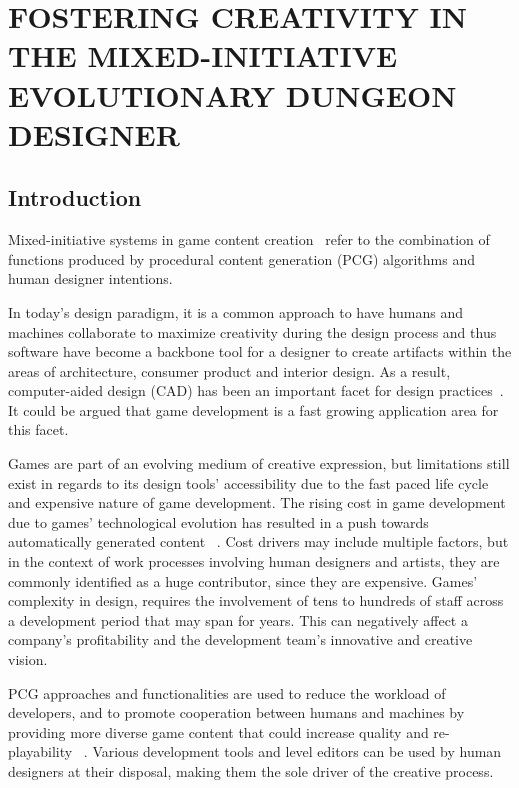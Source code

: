 \section*{FOSTERING CREATIVITY IN THE MIXED-INITIATIVE EVOLUTIONARY DUNGEON DESIGNER}

\subsection{Introduction} 

Mixed-initiative systems in game content creation~ refer to the combination of functions produced by procedural content generation (PCG) algorithms and human designer intentions. 

In today's design paradigm, it is a common approach to have humans and machines collaborate to maximize creativity during the design process and thus software have become a backbone tool for a designer to create artifacts within the areas of architecture, consumer product and interior design. As a result, computer-aided design (CAD) has been an important facet for design practices~. It could be argued that game development is a fast growing application area for this facet.

Games are part of an evolving medium of creative expression, but limitations still exist in regards to its design tools’ accessibility due to the fast paced life cycle and expensive nature of game development. The rising cost in game development due to games’ technological evolution has resulted in a push towards automatically generated content ~. Cost drivers may include multiple factors, but in the context of work processes involving human designers and artists, they are commonly identified as a huge contributor, since they are expensive. Games' complexity in design, requires the involvement of tens to hundreds of staff across a development period that may span for years. This can negatively affect a company’s profitability and the development team’s innovative and creative vision. 

PCG approaches and functionalities are used to reduce the workload of developers, and to promote cooperation between humans and machines by providing more diverse game content that could increase quality and re-playability ~. Various development tools and level editors can be used by human designers at their disposal, making them the sole driver of the creative process. 


